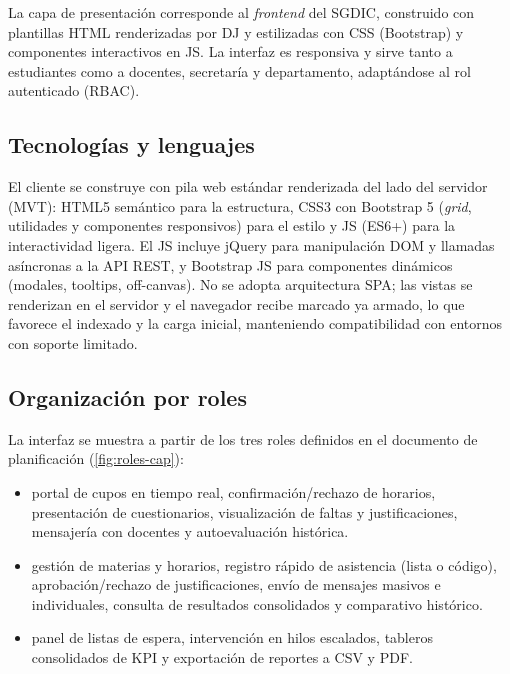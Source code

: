 La capa de presentación corresponde al \textit{frontend} del \ac{SGDIC},
construido con plantillas \ac{HTML} renderizadas por \ac{DJ} y estilizadas con
\ac{CSS} (Bootstrap) y componentes interactivos en \ac{JS}. La interfaz es
responsiva y sirve tanto a estudiantes como a docentes, secretaría y
departamento, adaptándose al rol autenticado (\ac{RBAC}).

\subsection{Tecnologías y lenguajes}
\label{sec:frontend-tecnologias}

El cliente se construye con pila web estándar renderizada del lado del
servidor (\ac{MVT}): \ac{HTML}5 semántico para la estructura, \ac{CSS}3 con
Bootstrap 5 (\textit{grid}, utilidades y componentes responsivos) para el
estilo y \ac{JS} (ES6+) para la interactividad ligera. El \ac{JS} incluye
jQuery para manipulación DOM y llamadas asíncronas a la \ac{API} \ac{REST},
y Bootstrap JS para componentes dinámicos (modales, tooltips,
off-canvas). No se adopta arquitectura \ac{SPA}; las vistas se renderizan en
el servidor y el navegador recibe marcado ya armado, lo que favorece el
indexado y la carga inicial, manteniendo compatibilidad con entornos con
soporte limitado.

\subsection{Organización por roles}
\label{sec:frontend-rol}

La interfaz se muestra a partir de los tres roles definidos en el
documento de planificación (\cref{fig:roles-cap}):
\begin{itemize}[label=-- , leftmargin=*]
  \item[\textbf{Estudiante}] portal de cupos en tiempo real,
  confirmación/rechazo de horarios, presentación de cuestionarios,
  visualización de faltas y justificaciones, mensajería con docentes y
  autoevaluación histórica.
  \item[\textbf{Docente}] gestión de materias y horarios, registro rápido de
  asistencia (lista o código), aprobación/rechazo de justificaciones,
  envío de mensajes masivos e individuales, consulta de resultados
  consolidados y comparativo histórico.
  \item[\textbf{Secretaría/departamento}] panel de listas de espera,
  intervención en hilos escalados, tableros consolidados de \ac{KPI} y
  exportación de reportes a \ac{CSV} y \ac{PDF}.
\end{itemize}

